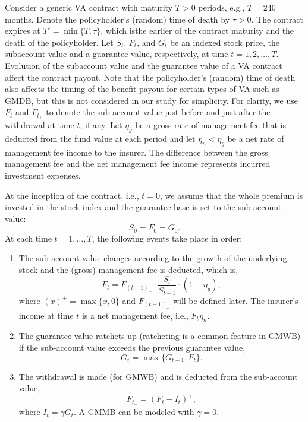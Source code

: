 Consider a generic VA contract with maturity $T>0$ periods, e.g., $T=240$ months.
Denote the policyholder's (random) time of death by $\tau>0$.
The contract expires at $T'=\min\{T,\tau\}$, which isthe earlier of the contract maturity and the death of the policyholder.
Let $S_t$, $F_t$, and $G_t$ be an indexed stock price, the subaccount value and a guarantee value, respectively, at time $t=1,2,\ldots,T$.
Evolution of the subaccount value and the guarantee value of a VA contract affect the contract payout.
Note that the policyholder's (random) time of death also affects the timing of the benefit payout for certain types of VA such as GMDB, but this is not considered in our study for simplicity.
For clarity, we use $F_t$ and $F_{t_+}$ to denote the sub-account value just before and just after the withdrawal at time $t$, if any.
Let $\eta_g$ be a gross rate of management fee that is deducted from the fund value at each period and let $\eta_n < \eta_g$ be a net rate of management fee income to the insurer.
The difference between the gross management fee and the net management fee income represents incurred investment expenses.

At the inception of the contract, i.e., $t=0$, we assume that the whole premium is invested in the stock index and the guarantee base is set to the sub-account value:
\begin{equation*}
    S_0=F_0=G_0.
\end{equation*}
At each time $t=1,\ldots,T$, the following events take place in order:
\begin{enumerate}
    \item The sub-account value changes according to the growth of the underlying stock and the (gross) management fee is deducted, which is, 
        \begin{equation*}
            F_t = F_{(t-1)_+}\cdot\frac{S_{t}}{S_{t-1}}\cdot(1-\eta_g),
        \end{equation*} 
    where $(x)^+=\max\{x,0\}$ and $F_{(t-1)_+}$ will be defined later. The insurer's income at time $t$ is a net management fee, i.e., $F_t\eta_n$. 

    \item The guarantee value ratchets up (ratcheting is a common feature in GMWB) if the sub-account value exceeds the previous guarantee value,
        \begin{equation*}
            G_t = \max\{G_{t-1},F_t\}.
        \end{equation*} 

    \item The withdrawal is made (for GMWB) and is deducted from the sub-account value,
        \begin{equation*}
            F_{t_+} = (F_t - I_t)^+,
        \end{equation*} 
    where $I_t = \gamma G_t$. A GMMB can be modeled with $\gamma = 0$.
\end{enumerate}

